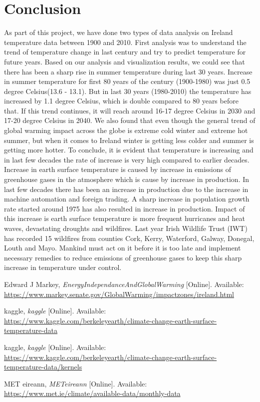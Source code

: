 \documentclass[journal,twoside,web]{ieeecolor}
\begin{document}
\section{Conclusion}
As part of this project, we have done two types of data analysis on Ireland temperature data between 1900 and 2010. First analysis was to understand the trend of temperature change in last century and try to predict temperature for future years.  Based on our analysis and visualization results, we could see that there has been a sharp rise in summer temperature during last 30 years.  Increase in summer temperature for first 80 years of the century (1900-1980) was just 0.5 degree Celsius(13.6 - 13.1). But in last 30 years (1980-2010) the temperature has increased by 1.1 degree Celsius, which is double compared to 80 years before that.  If this trend continues, it will reach around 16-17 degree Celsius in 2030 and 17-20 degree Celsius in 2040.  We also found that even though the general trend of global warming impact across the globe is extreme cold winter and extreme hot summer, but when it comes to Ireland winter is getting less colder and summer is getting more hotter.  To conclude, it is evident that temperature is increasing and in last few decades the rate of increase is very high compared to earlier decades. Increase in earth surface temperature is caused by increase in emissions of greenhouse gases in the atmosphere which is cause by increase in  production. In last few decades there has been an increase in production due to the increase in machine automation and foreign trading. A sharp increase in population growth rate started around 1975 has also resulted in increase in production.  Impact of this increase is earth surface temperature is more frequent hurricanes and heat waves, devastating droughts and wildfires. Last year Irish Wildlife Trust (IWT) has recorded 15 wildfires from counties Cork, Kerry, Waterford, Galway, Donegal, Louth and Mayo. Mankind must act on it before it is too late and implement necessary remedies to reduce emissions of greenhouse gases to keep this sharp increase in temperature under control. 

\begin{thebibliography}{00}
 Edward J Markey, \emph{EnergyIndependanceAndGlobalWarming} [Online]. Available: \underline{https://www.markey.senate.gov/GlobalWarming/impactzones/ireland.html}

 kaggle, \emph{kaggle} [Online]. Available: \underline{https://www.kaggle.com/berkeleyearth/climate-change-earth-surface-temperature-data}

 kaggle, \emph{kaggle} [Online]. Available: \underline{https://www.kaggle.com/berkeleyearth/climate-change-earth-surface-temperature-data/kernels}

 MET eireann, \emph{METeireann} [Online]. Available: \underline{https://www.met.ie/climate/available-data/monthly-data}


\end{thebibliography}
\end{document}
